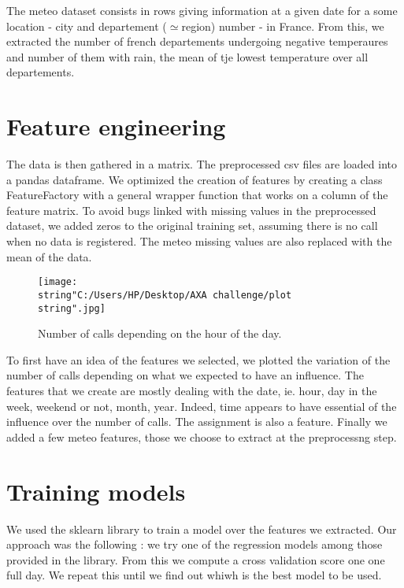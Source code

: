\documentclass[english]{article}
\begin{document}
The meteo dataset consists in rows giving information at a given date
for a some location - city and departement ($\simeq$region) number
- in France. From this, we extracted the number of french departements
undergoing negative temperaures and number of them with rain, the
mean of tje lowest temperature over all departements.


\section{Feature engineering}

The data is then gathered in a matrix. The preprocessed csv files
are loaded into a pandas dataframe. We optimized the creation of features
by creating a class FeatureFactory with a general wrapper function
that works on a column of the feature matrix. To avoid bugs linked
with missing values in the preprocessed dataset, we added zeros to
the original training set, assuming there is no call when no data
is registered. The meteo missing values are also replaced with the
mean of the data.

\begin{figure}
\begin{centering}
\texttt{[image: \\string"C:/Users/HP/Desktop/AXA challenge/plot\\string".jpg]}
\par\end{centering}

\caption{Number of calls depending on the hour of the day.}


\end{figure}


To first have an idea of the features we selected, we plotted the
variation of the number of calls depending on what we expected to
have an influence. The features that we create are mostly dealing
with the date, ie. hour, day in the week, weekend or not, month, year.
Indeed, time appears to have essential of the influence over the number
of calls. The assignment is also a feature. Finally we added a few
meteo features, those we choose to extract at the preprocessng step.


\section{Training models}

We used the sklearn library to train a model over the features we
extracted. Our approach was the following : we try one of the regression
models among those provided in the library. From this we compute a
cross validation score one one full day. We repeat this until we find
out whiwh is the best model to be used. 
\end{document}
